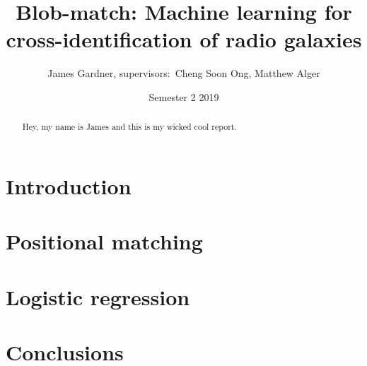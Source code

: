 \documentclass{article}
\title{Blob-match: Machine learning for cross-identification of radio galaxies}
\author{James Gardner, supervisors:\ Cheng Soon Ong, Matthew Alger}
\date{Semester 2 2019}
\begin{document}
\maketitle
\begin{abstract}
    Hey, my name is James and this is my wicked cool report.
\end{abstract}

\section{Introduction}

\section{Positional matching}

\section{Logistic regression}

\section{Conclusions}
\end{document}
